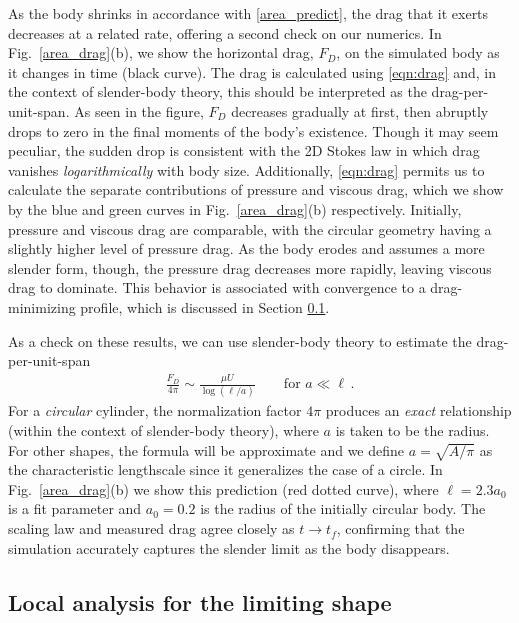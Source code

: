 \documentclass[preprint, 10pt]{elsarticle}
\begin{document}
	As the body shrinks in accordance with \eqref{area_predict}, the drag that it exerts decreases at a related rate, offering a second check on our numerics. In Fig.~\ref{area_drag}(b), we show the horizontal drag, $F_D$, on the simulated body as it changes in time (black curve). The drag is calculated using \eqref{eqn:drag} and, in the context of slender-body theory, this should be interpreted as the drag-per-unit-span. As seen in the figure, $F_D$ decreases gradually at first, then abruptly drops to zero in the final moments of the body's existence. Though it may seem peculiar, the sudden drop is consistent with the 2D Stokes law in which drag vanishes {\em logarithmically} with body size. Additionally, \eqref{eqn:drag} permits us to calculate the separate contributions of pressure and viscous drag, which we show by the blue and green curves in Fig.~\ref{area_drag}(b) respectively. Initially, pressure and viscous drag are comparable, with the circular geometry having a slightly higher level of pressure drag. As the body erodes and assumes a more slender form, though, the pressure drag decreases more rapidly, leaving viscous drag to dominate. This behavior is associated with convergence to a drag-minimizing profile, which is discussed in Section \ref{LimitingShape}.

As a check on these results, we can use slender-body theory to estimate the drag-per-unit-span
\begin{align}
\label{dragscaling}
\frac{F_D}{4 \pi} \sim \frac{ \mu U}{\log(\ell/a)}	\qquad \text{for } a \ll \ell \, .
\end{align}
For a {\em circular} cylinder, the normalization factor $4 \pi$ produces an {\em exact} relationship (within the context of slender-body theory), where $a$ is taken to be the radius. For other shapes, the formula will be approximate and we define $a = \sqrt{A/\pi}$ as the characteristic lengthscale since it generalizes the case of a circle. In Fig.~\ref{area_drag}(b) we show this prediction (red dotted curve), where $\ell = 2.3 a_0$ is a fit parameter and $a_0 = 0.2$ is the radius of the initially circular body. The scaling law and measured drag agree closely as $t \to t_f$, confirming that the simulation accurately captures the slender limit as the body disappears.


\subsection{Local analysis for the limiting shape}
\label{LimitingShape}
 
\end{document}
